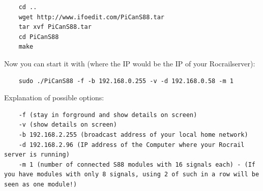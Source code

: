 \begin{verbatim}
	cd ..
	wget http://www.ifoedit.com/PiCanS88.tar
	tar xvf PiCanS88.tar
	cd PiCanS88
	make
\end{verbatim}

Now you can start it with (where the IP would be the IP of your Rocrailserver):

\begin{verbatim}
	sudo ./PiCanS88 -f -b 192.168.0.255 -v -d 192.168.0.58 -m 1
\end{verbatim}

Explanation of possible options:
\begin{verbatim}
	-f (stay in forground and show details on screen)
	-v (show details on screen)
	-b 192.168.2.255 (broadcast address of your local home network)
	-d 192.168.2.96 (IP address of the Computer where your Rocrail server is running)
	-m 1 (number of connected S88 modules with 16 signals each) - (If you have modules with only 8 signals, using 2 of such in a row will be seen as one module!)
\end{verbatim}

